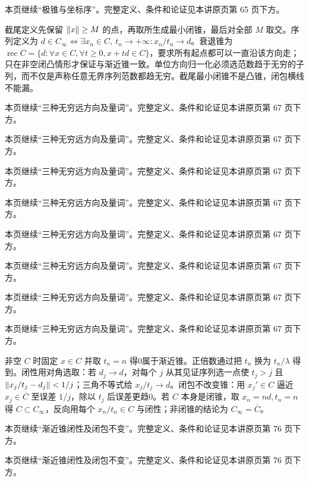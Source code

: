 本页继续“极锥与坐标序”。完整定义、条件和论证见本讲原页第 65 页下方。

截尾定义先保留 $\left\lVert x\right\rVert\ge M$ 的点，再取所生成最小闭锥，最后对全部 $M$ 取交。序列定义为 $d\in C_\infty\iff\exists x_n\in C,\ t_n\to+\infty:x_n/t_n\to d$。衰退锥为 $\operatorname{rec}C=\{d:\forall x\in C,\forall t\ge0,x+td\in C\}$，要求所有起点都可以一直沿该方向走；只在非空闭凸情形才保证与渐近锥一致。单位方向归一化必须选范数趋于无穷的子列，而不仅是声称任意无界序列范数都趋无穷。截尾最小闭锥不是凸锥，闭包横线不能漏。

本页继续“三种无穷远方向及量词”。完整定义、条件和论证见本讲原页第 67 页下方。

本页继续“三种无穷远方向及量词”。完整定义、条件和论证见本讲原页第 67 页下方。

本页继续“三种无穷远方向及量词”。完整定义、条件和论证见本讲原页第 67 页下方。

本页继续“三种无穷远方向及量词”。完整定义、条件和论证见本讲原页第 67 页下方。

本页继续“三种无穷远方向及量词”。完整定义、条件和论证见本讲原页第 67 页下方。

本页继续“三种无穷远方向及量词”。完整定义、条件和论证见本讲原页第 67 页下方。

本页继续“三种无穷远方向及量词”。完整定义、条件和论证见本讲原页第 67 页下方。

本页继续“三种无穷远方向及量词”。完整定义、条件和论证见本讲原页第 67 页下方。

非空 $C$ 时固定 $x\in C$ 并取 $t_n=n$ 得0属于渐近锥。正倍数通过把 $t_n$ 换为 $t_n/\lambda$ 得到。闭性用对角选取：若 $d_j\to d$，对每个 $j$ 从其见证序列选一点使 $t_j>j$ 且 $\left\lVert x_j/t_j-d_j\right\rVert<1/j$；三角不等式给 $x_j/t_j\to d$。闭包不改变锥：用 $x_j'\in C$ 逼近 $x_j\in\overline C$ 至误差 $1/j$，除以 $t_j$ 后误差更趋0。若 $C$ 本身是闭锥，取 $x_n=nd,t_n=n$ 得 $C\subset C_\infty$，反向用每个 $x_n/t_n\in C$ 与闭性；非闭锥的结论为 $C_\infty=\overline C$。

本页继续“渐近锥闭性及闭包不变”。完整定义、条件和论证见本讲原页第 76 页下方。

本页继续“渐近锥闭性及闭包不变”。完整定义、条件和论证见本讲原页第 76 页下方。

